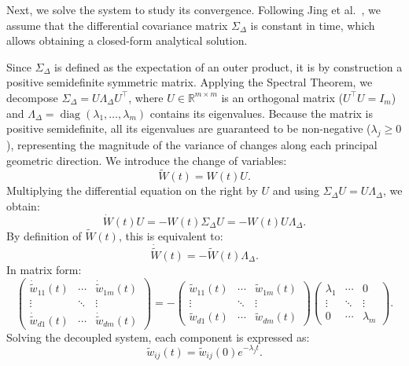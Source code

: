 \documentclass[11pt, oneside, openany]{book}
\DeclareMathOperator{\diag}{diag}
\begin{document}
Next, we solve the system to study its convergence. Following Jing et al.\ \cite{jing2022understanding}, we assume that the differential covariance matrix $\Sigma_{\Delta}$ is constant in time, which allows obtaining a closed-form analytical solution.

Since $\Sigma_{\Delta}$ is defined as the expectation of an outer product, it is by construction a positive semidefinite symmetric matrix. Applying the Spectral Theorem, we decompose $\Sigma_{\Delta} = U \Lambda_{\Delta} U^{\top}$, where $U \in \mathbb{R}^{m \times m}$ is an orthogonal matrix ($U^{\top} U = I_{m}$) and $\Lambda_{\Delta} = \diag(\lambda_{1}, \dots, \lambda_{m})$ contains its eigenvalues. Because the matrix is positive semidefinite, all its eigenvalues are guaranteed to be non-negative ($\lambda_{j} \geq 0$), representing the magnitude of the variance of changes along each principal geometric direction. We introduce the change of variables:
\begin{equation}
\label{eq:3.24}
\tilde{W}(t) = W(t) U.
\end{equation}
Multiplying the differential equation on the right by $U$ and using $\Sigma_{\Delta} U = U \Lambda_{\Delta}$, we obtain:
\begin{equation}
\label{eq:3.25}
\dot{W}(t) U = -W(t) \Sigma_{\Delta} U = -W(t) U \Lambda_{\Delta}.
\end{equation}
By definition of $\tilde{W}(t)$, this is equivalent to:
\begin{equation}
\label{eq:3.26}
\dot{\tilde{W}}(t) = -\tilde{W}(t) \Lambda_{\Delta}.
\end{equation}
In matrix form:
\begin{equation}
\label{eq:3.27}
\begin{pmatrix}
\dot{\tilde{w}}_{11}(t) & \cdots & \dot{\tilde{w}}_{1m}(t) \\
\vdots & \ddots & \vdots \\
\dot{\tilde{w}}_{d1}(t) & \cdots & \dot{\tilde{w}}_{dm}(t)
\end{pmatrix}
= -
\begin{pmatrix}
\tilde{w}_{11}(t) & \cdots & \tilde{w}_{1m}(t) \\
\vdots & \ddots & \vdots \\
\tilde{w}_{d1}(t) & \cdots & \tilde{w}_{dm}(t)
\end{pmatrix}
\begin{pmatrix}
\lambda_{1} & \cdots & 0 \\
\vdots & \ddots & \vdots \\
0 & \cdots & \lambda_{m}
\end{pmatrix}.
\end{equation}
Solving the decoupled system, each component is expressed as:
\begin{equation}
\label{eq:3.28}
\tilde{w}_{ij}(t) = \tilde{w}_{ij}(0) e^{-\lambda_{j} t}.
\end{equation}
\end{document}

